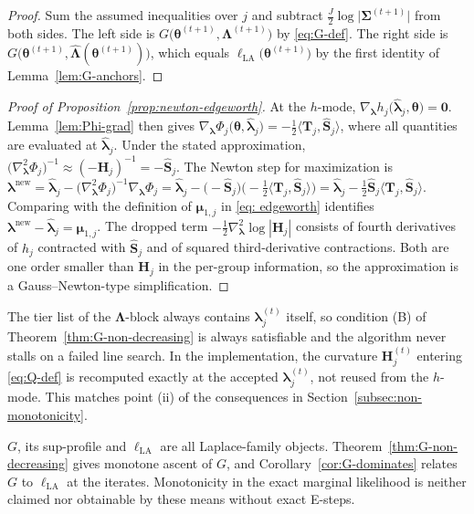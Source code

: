 \begin{proof}
Sum the assumed inequalities over $j$ and subtract $\frac{J}{2}\log\big|\bm{\Sigma}^{(t+1)}\big|$ from both sides. The left side is $G\big(\bm{\theta}^{(t+1)},\bm{\Lambda}^{(t+1)}\big)$ by \eqref{eq:G-def}. The right side is $G\big(\bm{\theta}^{(t+1)},\hat{\bm{\Lambda}}(\bm{\theta}^{(t+1)})\big)$, which equals $\ell_{\text{LA}}\big(\bm{\theta}^{(t+1)}\big)$ by the first identity of Lemma~\ref{lem:G-anchors}.
\end{proof}

\begin{proof}[Proof of Proposition~\ref{prop:newton-edgeworth}]
At the $h$-mode, $\nabla_{\bm{\lambda}}h_{j}\big(\hat{\bm{\lambda}}_{j},\bm{\theta}\big)=\bm{0}$. Lemma~\ref{lem:Phi-grad} then gives $\nabla_{\bm{\lambda}}\Phi_{j}\big(\bm{\theta},\hat{\bm{\lambda}}_{j}\big)=-\frac{1}{2}\big\langle\mathbf{T}_{j},\hat{\mathbf{S}}_{j}\big\rangle$, where all quantities are evaluated at $\hat{\bm{\lambda}}_{j}$. Under the stated approximation, $\big(\nabla^{2}_{\bm{\lambda}}\Phi_{j}\big)^{-1}\approx(-\mathbf{H}_{j})^{-1}=-\hat{\mathbf{S}}_{j}$. The Newton step for maximization is $\bm{\lambda}^{\mathrm{new}}=\hat{\bm{\lambda}}_{j}-\big(\nabla^{2}_{\bm{\lambda}}\Phi_{j}\big)^{-1}\nabla_{\bm{\lambda}}\Phi_{j}=\hat{\bm{\lambda}}_{j}-\big(-\hat{\mathbf{S}}_{j}\big)\Big(-\frac{1}{2}\big\langle\mathbf{T}_{j},\hat{\mathbf{S}}_{j}\big\rangle\Big)=\hat{\bm{\lambda}}_{j}-\frac{1}{2}\hat{\mathbf{S}}_{j}\big\langle\mathbf{T}_{j},\hat{\mathbf{S}}_{j}\big\rangle$. Comparing with the definition of $\bm{\mu}_{1,j}$ in \eqref{eq: edgeworth} identifies $\bm{\lambda}^{\mathrm{new}}-\hat{\bm{\lambda}}_{j}=\bm{\mu}_{1,j}$. The dropped term $-\frac{1}{2}\nabla^{2}_{\bm{\lambda}}\log|\mathbf{H}_{j}|$ consists of fourth derivatives of $h_{j}$ contracted with $\hat{\mathbf{S}}_{j}$ and of squared third-derivative contractions. Both are one order smaller than $\mathbf{H}_{j}$ in the per-group information, so the approximation is a Gauss--Newton-type simplification.
\end{proof}

\begin{remark}
The tier list of the $\bm{\Lambda}$-block always contains $\bm{\lambda}_{j}^{(t)}$ itself, so condition (B) of Theorem~\ref{thm:G-non-decreasing} is always satisfiable and the algorithm never stalls on a failed line search. In the implementation, the curvature $\mathbf{H}_{j}^{(t)}$ entering \eqref{eq:Q-def} is recomputed exactly at the accepted $\bm{\lambda}_{j}^{(t)}$, not reused from the $h$-mode. This matches point (ii) of the consequences in Section~\ref{subsec:non-monotonicity}.
\label{rem:tiers}
\end{remark}

\begin{remark}
$G$, its sup-profile and $\ell_{\text{LA}}$ are all Laplace-family objects. Theorem~\ref{thm:G-non-decreasing} gives monotone ascent of $G$, and Corollary~\ref{cor:G-dominates} relates $G$ to $\ell_{\text{LA}}$ at the iterates. Monotonicity in the exact marginal likelihood is neither claimed nor obtainable by these means without exact E-steps.
\label{rem:scope}
\end{remark}